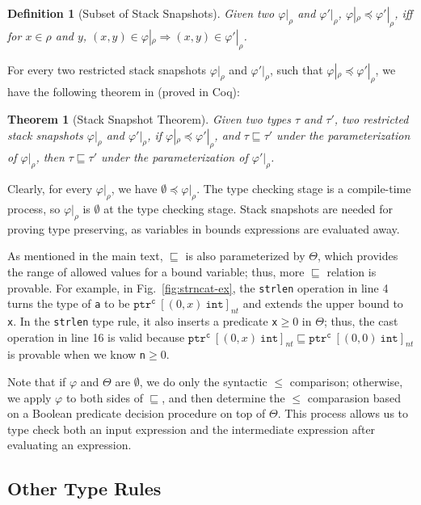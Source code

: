 \documentclass[conference]{IEEEtran}
\newcommand{\code}[1]{\lstinline|#1|}
\newtheorem{defi}{Definition}
\newtheorem{thm}{Theorem}
\newcommand{\checkedc}{\text{Checked C}\xspace}
\newcommand{\tarrayb}[2]{\ensuremath{[{#1}~{#2}]}}
\newcommand{\tntarray}[3]{\tntarrayb{({#1},{#2})}{#3}}
\newcommand{\tntarrayb}[2]{\tarrayb{#1}{#2}_{nt}}
\newcommand{\tptr}[2]{\ensuremath{\mathtt{ptr}^{#2}~{#1}}}
\newcommand{\tntarrayptr}[4]{{\tptr{\tntarray{#1}{#2}{#3}}{#4}}}
\newcommand{\tint}{\ensuremath{\mathtt{int}}}
\newcommand{\cmode}{\texttt{c}}
\begin{document}
\begin{defi}[Subset of Stack Snapshots]
  Given two $\varphi|_{\rho}$ and $\varphi'|_{\rho}$,
  $\varphi|_{\rho} \preceq \varphi'|_{\rho}$, iff for $x\in\rho$ and
  $y$,
  $(x,y) \in \varphi|_{\rho} \Rightarrow (x,y) \in \varphi'|_{\rho}$.
\end{defi}

For every two restricted stack snapshots $\varphi|_{\rho}$ and
$\varphi'|_{\rho}$, such that
$\varphi|_{\rho} \preceq \varphi'|_{\rho}$, we have the following
theorem in \checkedc (proved in Coq):

\begin{thm}[Stack Snapshot Theorem]
  Given two types $\tau$ and $\tau'$, two restricted stack snapshots
  $\varphi|_{\rho}$ and $\varphi'|_{\rho}$, if
  $\varphi|_{\rho}\preceq \varphi'|_{\rho}$, and
  $\tau \sqsubseteq \tau'$ under the parameterization of
  $\varphi|_{\rho}$, then $\tau \sqsubseteq \tau'$ under the
  parameterization of $\varphi'|_{\rho}$.
\end{thm}

Clearly, for every $\varphi|_{\rho}$, we have
$\emptyset \preceq \varphi|_{\rho}$. The type checking stage is a
compile-time process, so $\varphi|_{\rho}$
is $\emptyset$ at the type checking stage. Stack snapshots are needed
for proving type preserving, as variables in bounds expressions are
evaluated away.

As mentioned in the main text, $\sqsubseteq$ is also parameterized by
$\Theta$, which provides the range of allowed values for a bound
variable; thus, more $\sqsubseteq$ relation is provable. For example,
in Fig.~\ref{fig:strncat-ex}, the \code{strlen} operation in line 4
turns the type of \code{a} to be $\tntarrayptr{0}{x}{\tint}{\cmode}$
and extends the upper bound to \code{x}. In the \code{strlen} type
rule, it also inserts a predicate \code{x}$\ge 0$ in $\Theta$; thus,
the cast operation in line 16 is valid because
$\tntarrayptr{0}{x}{\tint}{\cmode} \sqsubseteq
\tntarrayptr{0}{0}{\tint}{\cmode}$ is provable when we know
\code{n}$\ge 0$.

Note that if $\varphi$ and $\Theta$ are $\emptyset$, we do only the
syntactic $\le$ comparison; otherwise, we apply $\varphi$ to both
sides of $\sqsubseteq$, and then determine the $\le$ comparasion based
on a Boolean predicate decision procedure on top of $\Theta$. This
process allows us to type check both an input expression and the
intermediate expression after evaluating an expression. 

\subsection{Other Type Rules}\label{rem-type}
\end{document}
